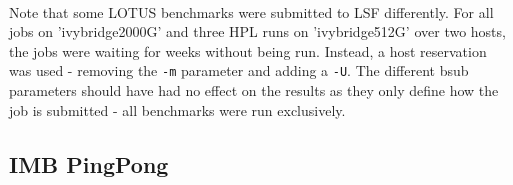 \documentclass{article}
\begin{document}
    \paragraph{}
    Note that some LOTUS benchmarks were submitted to LSF differently. For all jobs on 'ivybridge2000G' and three HPL runs on 'ivybridge512G' over two hosts, the jobs were waiting for weeks without being run. Instead, a host reservation was used - removing the \texttt{-m} parameter and adding a \texttt{-U}. The different bsub parameters should have had no effect on the results as they only define how the job is submitted - all benchmarks were run exclusively.

    \subsection{IMB PingPong}
\end{document}

